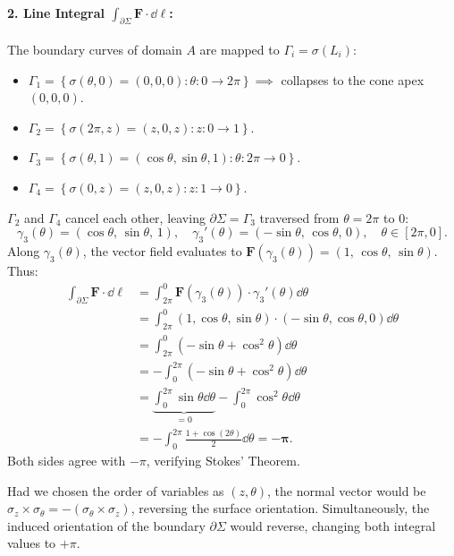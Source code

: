 \begin{exemple}
\paragraph{2. Line Integral $\int_{\partial\Sigma} \mathbf{F} \cdot \dd\bm{\ell}$:}
The boundary curves of domain $A$ are mapped to $\Gamma_i = \sigma(L_i)$:
\begin{itemize}
    \item $\Gamma_1 = \left\{ \sigma(\theta, 0) = (0, 0, 0) : \theta \colon 0 \to 2\pi \right\} \implies$ collapses to the cone apex $(0,0,0)$.
    \item $\Gamma_2 = \left\{ \sigma(2\pi, z) = (z, 0, z) : z \colon 0 \to 1 \right\}$.
    \item $\Gamma_3 = \left\{ \sigma(\theta, 1) = (\cos\theta, \sin\theta, 1) : \theta \colon 2\pi \to 0 \right\}$.
    \item $\Gamma_4 = \left\{ \sigma(0, z) = (z, 0, z) : z \colon 1 \to 0 \right\}$.
\end{itemize}
$\Gamma_2$ and $\Gamma_4$ cancel each other, leaving $\partial\Sigma = \Gamma_3$ traversed from $\theta = 2\pi$ to $0$:
\begin{equation*}
    \gamma_3(\theta) = (\cos\theta, \, \sin\theta, \, 1), \quad \gamma_3'(\theta) = (-\sin\theta, \, \cos\theta, \, 0), \quad \theta \in [2\pi, 0].
\end{equation*}
Along $\gamma_3(\theta)$, the vector field evaluates to $\mathbf{F}(\gamma_3(\theta)) = (1, \, \cos\theta, \, \sin\theta)$. Thus:
\begin{align*}
    \int_{\partial\Sigma} \mathbf{F} \cdot \dd\bm{\ell} &= \int_{2\pi}^0 \mathbf{F}(\gamma_3(\theta)) \cdot \gamma_3'(\theta) \dd\theta \\
    &= \int_{2\pi}^0 (1, \cos\theta, \sin\theta) \cdot (-\sin\theta, \cos\theta, 0) \dd\theta \\
    &= \int_{2\pi}^0 (-\sin\theta + \cos^2\theta) \dd\theta \\
    &= -\int_0^{2\pi} (-\sin\theta + \cos^2\theta) \dd\theta \\
    &= \underbrace{\int_0^{2\pi} \sin\theta \dd\theta}_{= 0} - \int_0^{2\pi} \cos^2\theta \dd\theta \\
    &= -\int_0^{2\pi} \frac{1 + \cos(2\theta)}{2} \dd\theta = \mathbf{-\pi}.
\end{align*}
Both sides agree with $-\pi$, verifying Stokes' Theorem.
\end{exemple}

\begin{remarque}
Had we chosen the order of variables as $(z, \theta)$, the normal vector would be $\sigma_z \times \sigma_\theta = -(\sigma_\theta \times \sigma_z)$, reversing the surface orientation. Simultaneously, the induced orientation of the boundary $\partial\Sigma$ would reverse, changing both integral values to $+\pi$.
\end{remarque}

